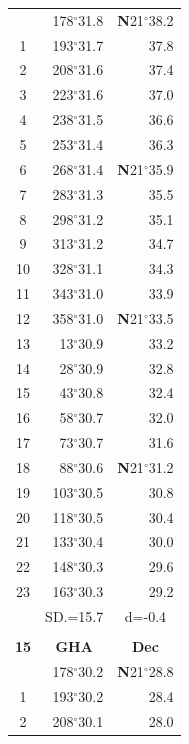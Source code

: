 \documentclass[10pt, a4paper]{report}
\begin{document}
\begin{scriptsize}
\begin{tabular*}{0.2\textwidth}[t]{@{\extracolsep{\fill}}|c|rr|}
\hline\rule{0pt}{2.6ex}\noindent
0 & 178$^\circ$31.8 & \textbf{N}21$^\circ$38.2\\
1 & 193$^\circ$31.7 & 37.8\\
2 & 208$^\circ$31.6 & 37.4\\
3 & 223$^\circ$31.6 & \raisebox{0.24ex}{\boldmath$\cdot$~\boldmath$\cdot$~~}37.0\\
4 & 238$^\circ$31.5 & 36.6\\
5 & 253$^\circ$31.4 & 36.3\\[2Pt]
6 & 268$^\circ$31.4 & \textbf{N}21$^\circ$35.9\\
7 & 283$^\circ$31.3 & 35.5\\
8 & 298$^\circ$31.2 & 35.1\\
9 & 313$^\circ$31.2 & \raisebox{0.24ex}{\boldmath$\cdot$~\boldmath$\cdot$~~}34.7\\
10 & 328$^\circ$31.1 & 34.3\\
11 & 343$^\circ$31.0 & 33.9\\[2Pt]
12 & 358$^\circ$31.0 & \textbf{N}21$^\circ$33.5\\
13 & 13$^\circ$30.9 & 33.2\\
14 & 28$^\circ$30.9 & 32.8\\
15 & 43$^\circ$30.8 & \raisebox{0.24ex}{\boldmath$\cdot$~\boldmath$\cdot$~~}32.4\\
16 & 58$^\circ$30.7 & 32.0\\
17 & 73$^\circ$30.7 & 31.6\\[2Pt]
18 & 88$^\circ$30.6 & \textbf{N}21$^\circ$31.2\\
19 & 103$^\circ$30.5 & 30.8\\
20 & 118$^\circ$30.5 & 30.4\\
21 & 133$^\circ$30.4 & \raisebox{0.24ex}{\boldmath$\cdot$~\boldmath$\cdot$~~}30.0\\
22 & 148$^\circ$30.3 & 29.6\\
23 & 163$^\circ$30.3 & 29.2\\
\hline
\rule{0pt}{2.4ex} & \multicolumn{1}{c}{SD.=15.7} & \multicolumn{1}{c|}{d=-0.4}\\
\hline
\multicolumn{1}{c}{}\\[-0.5ex]\hline
\multicolumn{1}{|c|}{\rule{0pt}{2.6ex}\textbf{15}} & \multicolumn{1}{c}{\textbf{GHA}} & \multicolumn{1}{c|}{\textbf{Dec}}\\
\hline\rule{0pt}{2.6ex}\noindent
0 & 178$^\circ$30.2 & \textbf{N}21$^\circ$28.8\\
1 & 193$^\circ$30.2 & 28.4\\
2 & 208$^\circ$30.1 & 28.0\\

\end{tabular*}
\end{scriptsize}
\end{document}
